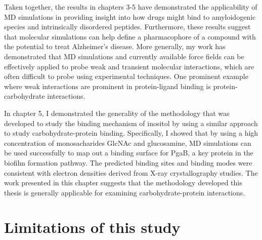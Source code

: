 Taken together, the results in chapters 3-5 have demonstrated the applicability of MD simulations in providing insight into how drugs might bind to amyloidogenic species and intrinsically disordered peptides.  Furthermore, these results suggest that molecular simulations can help define a pharmacophore of a compound with the potential to treat Alzheimer's disease. 
More generally, my work has demonstrated that MD simulations and currently available force fields can be effectively applied to probe weak and transient molecular interactions, which are often difficult to probe using experimental techniques. One prominent example where weak interactions are prominent in protein-ligand binding is protein-carbohydrate interactions.\cite{weak binding review paper}

In chapter 5, I demonstrated the generality of the methodology that was developed to study the binding mechanism of inositol by using a similar approach to study carbohydrate-protein binding. Specifically, I showed that by using a high concentration of monosacharides GlcNAc and glucosamine, MD simulations can be used successfully to map out a binding surface for PgaB, a key protein in the biofilm formation pathway. The predicted binding sites and binding modes were consistent with electron densities derived from X-ray crystallography studies.  The work presented in this chapter suggests that the methodology developed this thesis is generally applicable for examining carbohydrate-protein interactions.

\section{Limitations of this study}

